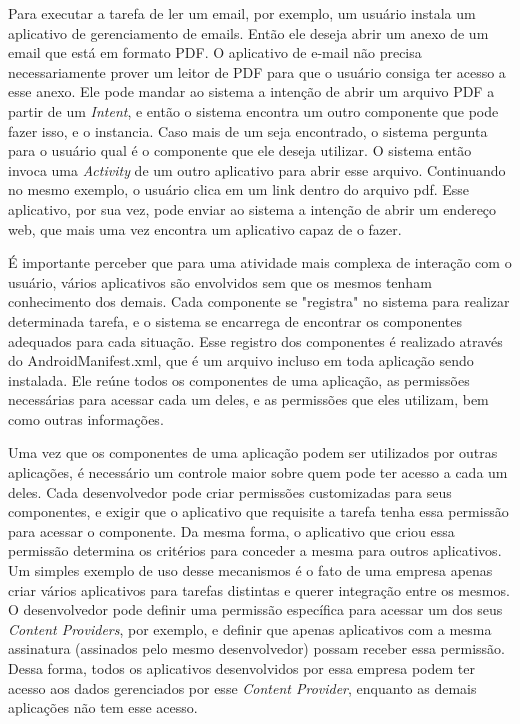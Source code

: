Para executar a tarefa de ler um email, por exemplo, um usuário instala um aplicativo de gerenciamento de emails. Então ele deseja abrir um anexo de um email que está em formato PDF. O aplicativo de e-mail não precisa necessariamente prover um leitor de PDF para que o usuário consiga ter acesso a esse anexo. Ele pode mandar ao sistema a intenção de abrir um arquivo PDF a partir de um \textit{Intent}, e então o sistema encontra um outro componente que pode fazer isso, e o instancia. Caso mais de um seja encontrado, o sistema pergunta para o usuário qual é o componente que ele deseja utilizar. O sistema então invoca uma \textit{Activity} de um outro aplicativo para abrir esse arquivo. Continuando no mesmo exemplo, o usuário clica em um link dentro do arquivo pdf. Esse aplicativo, por sua vez, pode enviar ao sistema a intenção de abrir um endereço web, que mais uma vez encontra um aplicativo capaz de o fazer.  

É importante perceber que para uma atividade mais complexa de interação com o usuário, vários aplicativos são envolvidos sem que os mesmos tenham conhecimento dos demais. Cada componente se "registra" no sistema para realizar determinada tarefa, e o sistema se encarrega de encontrar os componentes adequados para cada situação. Esse registro dos componentes é realizado através do AndroidManifest.xml, que é um arquivo incluso em toda aplicação sendo instalada. Ele reúne todos os componentes de uma aplicação, as permissões necessárias para acessar cada um deles, e as permissões que eles utilizam, bem como outras informações. 

Uma vez que os componentes de uma aplicação podem ser utilizados por outras aplicações, é necessário um controle maior sobre quem pode ter acesso a cada um deles. Cada desenvolvedor pode criar permissões customizadas para seus componentes, e exigir que o aplicativo que requisite a tarefa tenha essa permissão para acessar o componente. Da mesma forma, o aplicativo que criou essa permissão determina os critérios para conceder a mesma para outros aplicativos. Um simples exemplo de uso desse mecanismos é o fato de uma empresa apenas criar vários aplicativos para tarefas distintas e querer integração entre os mesmos. O desenvolvedor pode definir uma permissão específica para acessar um dos seus \textit{Content Providers}, por exemplo, e definir que apenas aplicativos com a mesma assinatura (assinados pelo mesmo desenvolvedor) possam receber essa permissão. Dessa forma, todos os aplicativos desenvolvidos por essa empresa podem ter acesso aos dados gerenciados por esse \textit{Content Provider}, enquanto as demais aplicações não tem esse acesso. 

